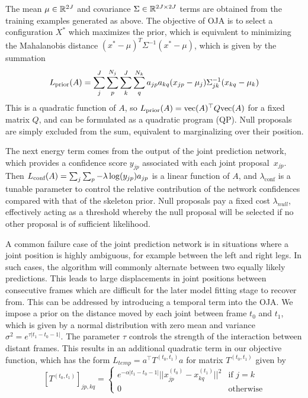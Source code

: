 The mean $\mu \in {\mathbb{R}^{2J}}$ and covariance $\Sigma \in {\mathbb{R}^{2J\times 2J}}$ terms are obtained from the training examples generated as above. The objective of OJA is to select a configuration $X^*$ which maximizes the prior, which is equivalent to minimizing the Mahalanobis distance
$(x^*-\mu)^T\Sigma^{-1}(x^*-\mu)$, which is given by the summation
\begin{equation}
L_{\text{prior}}(A) = \sum_j^J\sum_p^{N_j}\sum_k^J\sum_q^{N_k}a_{jp}a_{kq}(x_{jp} - \mu_j)\Sigma_{jk}^{-1}(x_{kq}-\mu_k)
\end{equation}
This is a quadratic function of $A$, so $L_{\text{prior}}(A) = \text{vec}(A)^\top Q \text{vec}(A)$ for a fixed matrix $Q$, and can be formulated as a quadratic program (QP).  Null proposals are simply excluded from the sum, equivalent to marginalizing over their position. 

The next energy term comes from the output of the joint prediction network, which provides a confidence score $y_{jp}$ associated with each joint proposal~$x_{jp}$.  Then $L_{\text{conf}}(A) = \sum_j\sum_p -\lambda\log(y_{jp}) a_{jp}$ is a linear function of $A$, 
and $\lambda_{\text{conf}}$ is a tunable parameter to control the relative contribution of the network confidences compared with that of the skeleton prior.
Null proposals pay a fixed cost $\lambda_{null}$, effectively acting as a threshold whereby the null proposal will be selected if no other proposal is of sufficient likelihood. 

A common failure case of the joint prediction network is in situations where a joint position is highly ambiguous, for example between the left and right legs. In such cases, the algorithm will commonly alternate between two equally likely predictions. This leads to large displacements in joint positions between consecutive frames which are difficult for the later model fitting stage to recover from. This can be addressed by introducing a temporal term into the OJA. We impose a prior on the distance moved by each joint between frame $t_0$ and $t_1$, which is given by a normal distribution with zero mean and variance $\sigma^{2} =e^{\tau|t_1 - t_0 - 1|}$. 
The parameter $\tau$ controls the strength of the interaction between distant frames. This results in an additional quadratic term in our objective function, which has the form $L_{temp} = a^\top T^{(t_0, t_1)} a$ for matrix $T^{(t_0, t_1)}$ given by 
\begin{equation}
\left[T^{(t_0, t_1)}\right]_{jp, kq} = \begin{cases}
e^{-\alpha|t_1 - t_0 - 1|}||x^{(t_0)}_{jp} - x^{(t_1)}_{kq}||^2 & \text{if } j=k\\
0 & \text{otherwise}
\end{cases}
\end{equation}

